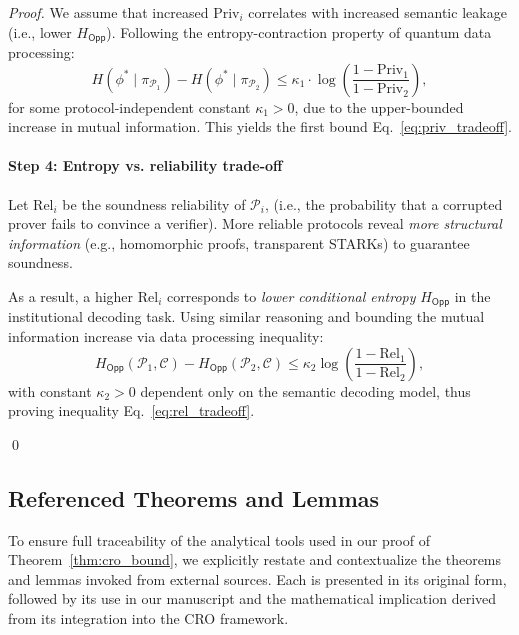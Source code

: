 \documentclass[preprint,12pt]{elsarticle}
\begin{document}
\begin{proof}
                    We assume that increased $\mathrm{Priv}_i$ correlates with increased semantic leakage (i.e., lower $H_{\mathsf{Opp}}$). Following the entropy-contraction property of quantum data processing:
                    \[
                        H(\phi^* \mid \pi_{\mathcal{P}_1}) - H(\phi^* \mid \pi_{\mathcal{P}_2}) \leq \kappa_1 \cdot \log\left(\frac{1 - \mathrm{Priv}_1}{1 - \mathrm{Priv}_2}\right),
                    \]
                    for some protocol-independent constant $\kappa_1 > 0$, due to the upper-bounded increase in mutual information. This yields the first bound Eq.~\ref{eq:priv_tradeoff}.

                    \paragraph{Step 4: Entropy vs. reliability trade-off}
                    Let $\mathrm{Rel}_i$ be the soundness reliability of $\mathcal{P}_i$, (i.e., the probability that a corrupted prover fails to convince a verifier). More reliable protocols reveal \emph{more structural information} (e.g., homomorphic proofs, transparent STARKs) to guarantee soundness.

                    As a result, a higher $\mathrm{Rel}_i$ corresponds to \emph{lower conditional entropy} $H_{\mathsf{Opp}}$ in the institutional decoding task. Using similar reasoning and bounding the mutual information increase via data processing inequality:
                    \[
                        H_{\mathsf{Opp}}(\mathcal{P}_1, \mathcal{C}) - H_{\mathsf{Opp}}(\mathcal{P}_2, \mathcal{C}) \leq \kappa_2 \log\left(\frac{1 - \mathrm{Rel}_1}{1 - \mathrm{Rel}_2}\right),
                    \]
                    with constant $\kappa_2 > 0$ dependent only on the semantic decoding model, thus proving inequality Eq.~\ref{eq:rel_tradeoff}.

                    \qed
                \end{proof}
            \subsection{Referenced Theorems and Lemmas}\label{app:A.6_referenced_tools}
                To ensure full traceability of the analytical tools used in our proof of Theorem~\ref{thm:cro_bound}, we explicitly restate and contextualize the theorems and lemmas invoked from external sources. Each is presented in its original form, followed by its use in our manuscript and the mathematical implication derived from its integration into the CRO framework.
\end{document}
